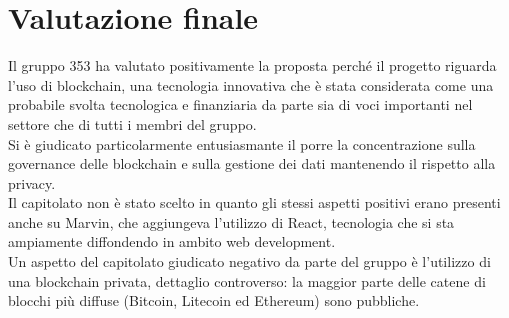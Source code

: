 \documentclass[StudioDiFattibilità.tex]{subfiles}
\begin{document}
\section{Valutazione finale}
Il gruppo 353 ha valutato positivamente la proposta perché il progetto riguarda l'uso di blockchain, una tecnologia innovativa che è stata considerata come una probabile svolta tecnologica e finanziaria da parte sia di voci importanti nel settore che di tutti i membri del gruppo.\\
Si è giudicato particolarmente entusiasmante il porre la concentrazione sulla governance delle blockchain e sulla gestione dei dati mantenendo il rispetto alla privacy.\\
Il capitolato non è stato scelto in quanto gli stessi aspetti positivi erano presenti anche su Marvin, che aggiungeva l'utilizzo di React, tecnologia che si sta ampiamente diffondendo in ambito web development.\\
Un aspetto del capitolato giudicato negativo da parte del gruppo è l'utilizzo di una blockchain privata, dettaglio controverso: la maggior parte delle catene di blocchi più diffuse (Bitcoin, Litecoin ed Ethereum) sono pubbliche.
\end{document}
